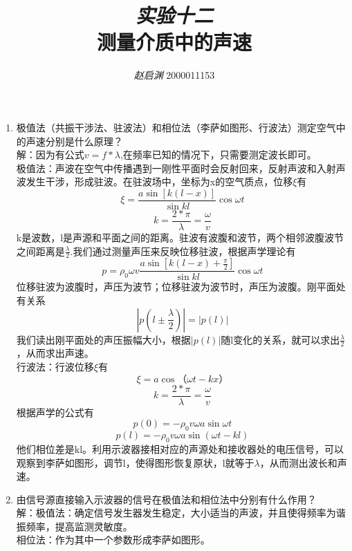\documentclass[a4paper,11pt]{article}
\title{\textit{\large 实验十二}\\[2mm]
		\textbf{\LARGE 测量介质中的声速}}
\author{\textit{赵启渊} 2000011153}
\date{}
\begin{document}
	
	
\maketitle
\thispagestyle{fancy}
\begin{enumerate}
	\item 极值法（共振干涉法、驻波法）和相位法（李萨如图形、行波法）测定空气中的声速分别是什么原理？\\
	解：因为有公式$ v = f * \lambda $,在频率已知的情况下，只需要测定波长即可。\\
	极值法：声波在空气中传播遇到一刚性平面时会反射回来，反射声波和入射声波发生干涉，形成驻波。在驻波场中，坐标为x的空气质点，位移$\xi$有$$ \xi = \dfrac{a\sin[k(l-x)]}{\sin kl}\cos \omega t $$
	$$ k = \frac{2*\pi}{\lambda} = \frac{\omega}{v}$$
	k是波数，l是声源和平面之间的距离。驻波有波腹和波节，两个相邻波腹波节之间距离是$\frac{\lambda}{2}$.我们通过测量声压来反映位移驻波，根据声学理论有$$ p = \rho_0 \omega v \dfrac{a\sin[k(l-x)+\frac{\pi}{2}]}{\sin kl}\cos \omega t $$
	位移驻波为波腹时，声压为波节；位移驻波为波节时，声压为波腹。刚平面处有关系$$ |p(l \pm \frac{\lambda}{2} )| = |p(l)| $$我们读出刚平面处的声压振幅大小，根据$ |p(l)| $随l变化的关系，就可以求出$\frac{\lambda}{2}$，从而求出声速。 \\
	行波法：行波位移$\xi$有$$ \xi = a\cos （\omega t- kx） $$
	$$ k = \frac{2*\pi}{\lambda} = \frac{\omega}{v}$$
	根据声学的公式有$$ p(0) = - \rho_0 v \omega a \sin \omega t $$
	$$ p(l) = - \rho_0 v \omega a \sin (\omega t - kl) $$
    他们相位差是kl。利用示波器接相对应的声源处和接收器处的电压信号，可以观察到李萨如图形，调节l，使得图形恢复原状，l就等于$\lambda$，从而测出波长和声速。	
	
	\item 由信号源直接输入示波器的信号在极值法和相位法中分别有什么作用？ \\
	解：极值法：确定信号发生器发生稳定，大小适当的声波，并且使得频率为谐振频率，提高监测灵敏度。\\
	相位法：作为其中一个参数形成李萨如图形。
	

\end{enumerate}
\end{document}
